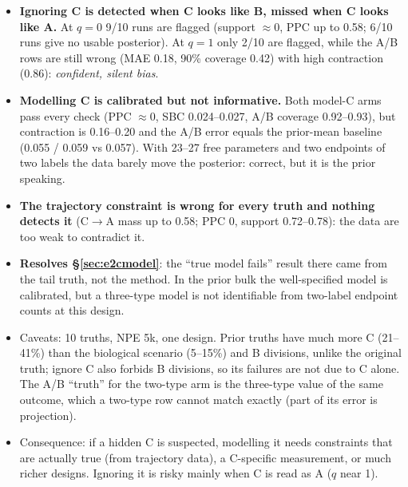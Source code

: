 \documentclass[10pt,a4paper]{article}
\begin{document}
\begin{itemize}
\item \textbf{Ignoring C is detected when C looks like B, missed when C looks like A.} At $q=0$ 9/10 runs are flagged (support $\approx 0$, PPC up to 0.58; 6/10 runs give no usable posterior). At $q=1$ only 2/10 are flagged, while the A/B rows are still wrong (MAE 0.18, 90\% coverage 0.42) with high contraction (0.86): \emph{confident, silent bias}.
\item \textbf{Modelling C is calibrated but not informative.} Both model-C arms pass every check (PPC $\approx 0$, SBC 0.024--0.027, A/B coverage 0.92--0.93), but contraction is 0.16--0.20 and the A/B error equals the prior-mean baseline (0.055 / 0.059 vs 0.057). With 23--27 free parameters and two endpoints of two labels the data barely move the posterior: correct, but it is the prior speaking.
\item \textbf{The trajectory constraint is wrong for every truth and nothing detects it} (C$\to$A mass up to 0.58; PPC 0, support 0.72--0.78): the data are too weak to contradict it.
\item \textbf{Resolves \S\ref{sec:e2cmodel}}: the ``true model fails'' result there came from the tail truth, not the method. In the prior bulk the well-specified model is calibrated, but a three-type model is not identifiable from two-label endpoint counts at this design.
\item Caveats: 10 truths, NPE 5k, one design. Prior truths have much more C (21--41\%) than the biological scenario (5--15\%) and B divisions, unlike the original truth; ignore C also forbids B divisions, so its failures are not due to C alone. The A/B ``truth'' for the two-type arm is the three-type value of the same outcome, which a two-type row cannot match exactly (part of its error is projection).
\item Consequence: if a hidden C is suspected, modelling it needs constraints that are actually true (from trajectory data), a C-specific measurement, or much richer designs. Ignoring it is risky mainly when C is read as A ($q$ near 1).
\end{itemize}

\end{document}
